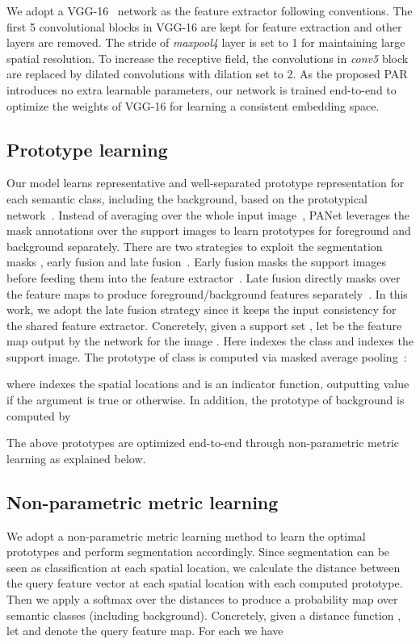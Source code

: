 \documentclass[10pt,twocolumn,letterpaper]{article}
\begin{document}
We adopt a VGG-16~\cite{simonyan2014very} network as the feature extractor following conventions. The first 5 convolutional blocks in VGG-16 are kept for feature extraction and other layers are removed. The stride of \textit{maxpool4} layer is set to 1 for maintaining large spatial resolution. To increase the receptive field, the convolutions in \textit{conv5} block are replaced by dilated convolutions with dilation set to 2. As the proposed PAR introduces no extra learnable parameters, our network is trained end-to-end to optimize the weights of VGG-16 for learning a consistent embedding space.

\subsection{Prototype learning}  \label{sec:method-prototype}

Our model learns representative and well-separated prototype representation for each semantic class, including the background, based on the prototypical network~\cite{snell2017prototypical}. Instead of averaging over the whole input image~\cite{snell2017prototypical}, PANet leverages the mask annotations over the support images to learn prototypes for foreground and background separately. There are two strategies to exploit the segmentation masks \ie, early fusion and late fusion~\cite{rakelly2018few}. Early fusion masks the support images before feeding them into the feature extractor~\cite{shaban2017one,Hu2018AttentionbasedMG,dong2018few}. Late fusion directly masks over the feature maps to produce foreground/background features separately~\cite{zhang2018sg, rakelly2018conditional}. In this work, we adopt the late fusion strategy since it keeps the input consistency for the shared feature extractor. Concretely, given a support set , let  be the feature map output by the network for the image . Here  indexes the class and  indexes the support image. The prototype of class  is computed via masked average pooling~\cite{zhang2018sg}:

where   indexes the spatial locations and  is an indicator function, outputting value  if the argument is true or  otherwise.
In addition, the prototype of background is computed by

The above prototypes are optimized end-to-end through non-parametric metric learning as explained below.

\subsection{Non-parametric metric learning}\label{dist}
We adopt a non-parametric metric learning method to learn the optimal prototypes and perform segmentation accordingly. Since segmentation can be seen as classification at each spatial location, we calculate the distance between the query feature vector at each spatial location with each computed prototype. Then we apply a softmax over the distances to produce a probability map  over semantic classes (including background). Concretely, given a distance function , let  and  denote the query feature map. For each  we have
\end{document}
